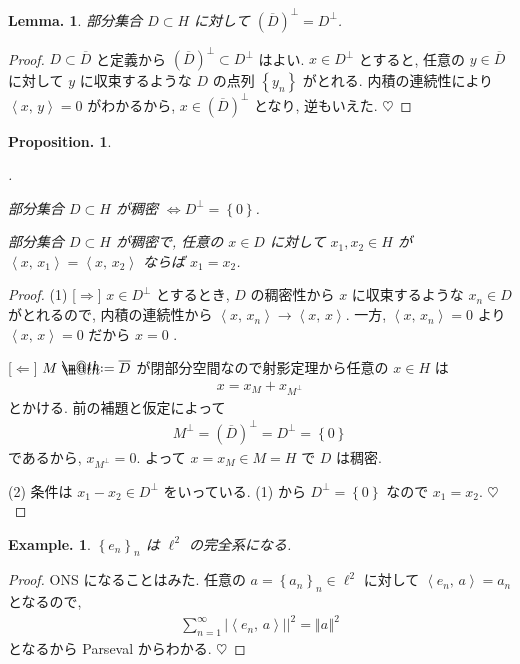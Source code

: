 \documentclass[openany, a4paper, oneside]{book}
\makeatletter
\newcounter{enum2}
\renewenvironment{enumerate}{%
\begin{list}%
{%
\arabic{enum2}.\ \,%
}%
{%
\usecounter{enum2}
\setlength{\itemindent}{0pt}%
\setlength{\leftmargin}{6pt}%
\setlength{\rightmargin}{0pt}%
\setlength{\labelsep}{0pt}%
\setlength{\labelwidth}{6pt}%
\setlength{\itemsep}{0pt}%
\setlength{\parsep}{0pt}%
\setlength{\listparindent}{0pt}%
}
}{%
\end{list}%
}
\newcommand*{\defeq}{\mathrel{\rlap{%
\raisebox{0.3ex}{$\m@th\cdot$}}%
\raisebox{-0.3ex}{$\m@th\cdot$}}%
=}
\theoremstyle{break}
\newtheorem{lem}[thm]{Lemma.}
\newtheorem{prop}[thm]{Proposition.}
\theoremstyle{breakdefn}
\newtheorem{ex}[thm]{Example.}
\newcommand{\abs}[1]{\left|#1\right|}
\newcommand{\norm}[1]{\left\Vert#1\right\Vert}
\newcommand{\rbk}[1]{\left (#1\right)}
\newcommand{\cbk}[1]{\left\{#1\right\}}
\newcommand{\bkt}[2]{\left\langle#1,\,#2\right\rangle}
\makeatother
\begin{document}
\begin{lem}
 部分集合 $D \subset H$ に対して $(\overline{D})^\perp = D^\perp$.
\end{lem}
\begin{proof}
$D \subset \overline{D}$ と定義から $(\overline{D})^\perp \subset D^\perp$ はよい.
$x \in D^\perp$ とすると, 任意の $y \in \overline{D}$ に対して $y$ に収束するような $D$ の点列 $\cbk{y_n}$ がとれる.
内積の連続性により $\bkt{x}{y} = 0$ がわかるから,
$x \in (\overline{D})^\perp$ となり, 逆もいえた.
$\heartsuit$
\end{proof}

\begin{prop}
\begin{enumerate}
\item 部分集合 $D \subset H$ が稠密 $\Longleftrightarrow D^\perp = \cbk{0}$.
\item 部分集合 $D \subset H$ が稠密で, 任意の $x \in D$ に対して $x_{1}, x_{2} \in H$ が
    $\bkt{x}{x_1} = \bkt{x}{x_2}$ ならば $x_{1} = x_{2}$.
\end{enumerate}
\end{prop}
\begin{proof}
(1) [$\Longrightarrow$]
$x \in D^\perp$ とするとき, $D$ の稠密性から $x$ に収束するような $x_{n} \in D$ がとれるので,
内積の連続性から $\bkt{x}{x_n} \to \bkt{x}{x}$.
一方, $\bkt{x}{x_n} = 0$ より $\bkt{x}{x} = 0$ だから $x = 0$ .

[$\Longleftarrow$]
$M \defeq \overline{D}$ が閉部分空間なので射影定理から任意の $x \in H$ は
\begin{align}
 x
 =
 x_{M} + x_{M^\perp}
\end{align}
とかける.
前の補題と仮定によって
\begin{align}
 M^\perp
 = \rbk{\overline{D}}^\perp
 =
 D^\perp
 =
 \cbk{0}
\end{align}
であるから, $x_{M^\perp} = 0$.
よって $x = x_{M} \in M = H$ で $D$ は稠密.

(2) 条件は $x_1 - x_2 \in D^\perp$ をいっている.
(1) から $D^\perp = \cbk{0}$ なので $x_1 = x_2$.
$\heartsuit$
\end{proof}

\begin{ex}
 $\cbk{e_n}_n$ は $\ell^2$ の完全系になる.
\end{ex}
\begin{proof}
ONS になることはみた.
任意の $a = \cbk{a_{n}}_n \in \ell^2$ に対して $\bkt{e_n}{a} = a_n$ となるので,
\begin{align}
 \sum_{n=1}^\infty \abs{\bkt{e_n}{a}}|^2
 =
 \norm{a}^2
\end{align}
となるから Parseval からわかる.
$\heartsuit$
\end{proof}
\end{document}
